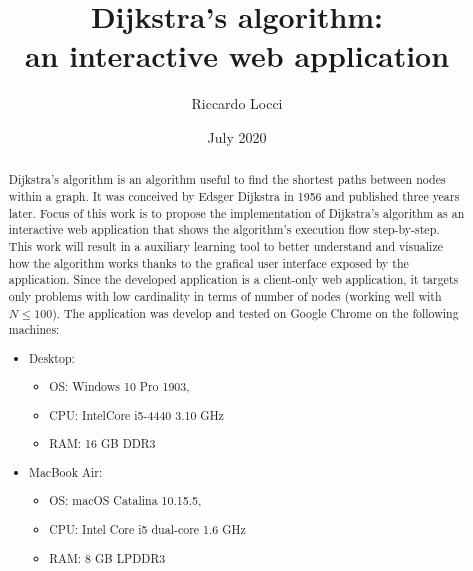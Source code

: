\documentclass[9pt]{extarticle}
\title{Dijkstra's algorithm: \\ an interactive web application}
\date{July 2020}
\author{Riccardo Locci}
\begin{document}
    \maketitle
        
    \begin{abstract} 
        Dijkstra's algorithm is an algorithm useful to find the shortest paths between nodes within a graph. 
        It was conceived by Edsger Dijkstra in 1956 and published three years later.\cite{wiki:dijkstra} 
        Focus of this work is to propose the implementation of Dijkstra's algorithm as an interactive web application
        that shows the algorithm's execution flow step-by-step.
        This work will result in a auxiliary learning tool to better understand and visualize how the algorithm works
        thanks to the grafical user interface exposed by the application.
        Since the developed application is a client-only web application, it targets only problems with low cardinality
        in terms of number of nodes (working well with $N \leq 100$).
        The application was develop and tested on Google Chrome on the following machines:
        
        \begin{itemize}
            \item Desktop:
            \begin{itemize} 
                \item OS: Windows 10 Pro 1903, 
                \item CPU: Intel\textregistered Core i5-4440 3.10 GHz
                \item RAM: 16 GB DDR3 
            \end{itemize}
            \item MacBook Air:
            \begin{itemize} 
                \item OS: macOS Catalina 10.15.5, 
                \item CPU: Intel Core i5 dual-core 1.6 GHz
                \item RAM: 8 GB LPDDR3 
            \end{itemize}
        \end{itemize}
    \end{abstract}
\end{document}
